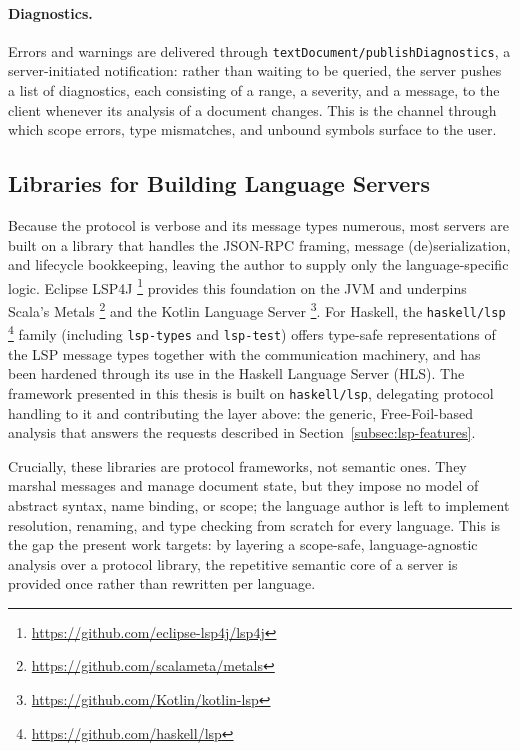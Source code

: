 \paragraph{Diagnostics.}
Errors and warnings are delivered through \texttt{textDocument/publishDiagnostics}, a server-initiated notification: rather than waiting to be queried, the server pushes a list of diagnostics, each consisting of a range, a severity, and a message, to the client whenever its analysis of a document changes. 
This is the channel through which scope errors, type mismatches, and unbound symbols surface to the user.

\subsection{Libraries for Building Language Servers}
\label{subsec:lsp-libraries}

Because the protocol is verbose and its message types numerous, most servers are built on a library that handles the JSON-RPC framing, message (de)serialization, and lifecycle bookkeeping, leaving the author to supply only the language-specific logic. 
Eclipse LSP4J \footnote{\url{https://github.com/eclipse-lsp4j/lsp4j}} provides this foundation on the JVM and underpins Scala's Metals \footnote{\url{https://github.com/scalameta/metals}} and the Kotlin Language Server \footnote{\url{https://github.com/Kotlin/kotlin-lsp}}. 
For Haskell, the \texttt{haskell/lsp} \footnote{\url{https://github.com/haskell/lsp}} family (including \texttt{lsp-types} and \texttt{lsp-test}) offers type-safe representations of the LSP message types together with the communication machinery, and has been hardened through its use in the Haskell Language Server (HLS). 
The framework presented in this thesis is built on \texttt{haskell/lsp}, delegating protocol handling to it and contributing the layer above: the generic, Free-Foil-based analysis that answers the requests described in Section~\ref{subsec:lsp-features}.

Crucially, these libraries are protocol frameworks, not semantic ones. 
They marshal messages and manage document state, but they impose no model of abstract syntax, name binding, or scope; the language author is left to implement resolution, renaming, and type checking from scratch for every language. 
This is the gap the present work targets: by layering a scope-safe, language-agnostic analysis over a protocol library, the repetitive semantic core of a server is provided once rather than rewritten per language.

